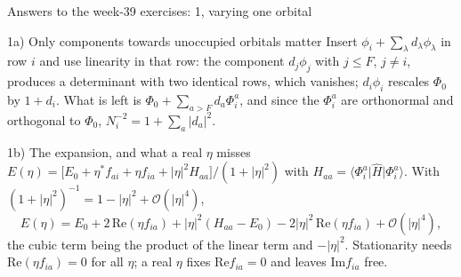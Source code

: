 \documentclass[aspectratio=169,10pt]{beamer}
\newcommand{\element}[3]{\langle #1\vert #2\vert #3\rangle}
\newcommand{\bigO}{\mathcal{O}}
\begin{document}
\begin{frame}{Answers to the week-39 exercises: 1, varying one orbital}
  \footnotesize
  \begin{block}{1a) Only components towards unoccupied orbitals matter}
    Insert $\phi_i+\sum_\lambda d_\lambda\phi_\lambda$ in row $i$ and use linearity in that row: the component $d_j\phi_j$ with $j\le F$, $j\ne i$, produces a determinant with two identical rows, which vanishes; $d_i\phi_i$ rescales $\Phi_0$ by $1+d_i$. What is left is $\Phi_0+\sum_{a>F}d_a\Phi_i^a$, and since the $\Phi_i^a$ are orthonormal and orthogonal to $\Phi_0$, $N_i^{-2}=1+\sum_a|d_a|^2$.
  \end{block}
  \begin{block}{1b) The expansion, and what a real $\eta$ misses}
    $E(\eta)=\bigl[E_0+\eta^{*}f_{ai}+\eta f_{ia}+|\eta|^2H_{aa}\bigr]/(1+|\eta|^2)$ with $H_{aa}=\element{\Phi_i^a}{\hat H}{\Phi_i^a}$. With $(1+|\eta|^2)^{-1}=1-|\eta|^2+\bigO(|\eta|^4)$,
    \[
      E(\eta)=E_0+2\,\mathrm{Re}(\eta f_{ia})+|\eta|^2(H_{aa}-E_0)-2|\eta|^2\,\mathrm{Re}(\eta f_{ia})+\bigO(|\eta|^4),
    \]
    the cubic term being the product of the linear term and $-|\eta|^2$. Stationarity needs $\mathrm{Re}(\eta f_{ia})=0$ for all $\eta$; a real $\eta$ fixes $\mathrm{Re}f_{ia}=0$ and leaves $\mathrm{Im}f_{ia}$ free.
  \end{block}
\end{frame}
\end{document}
